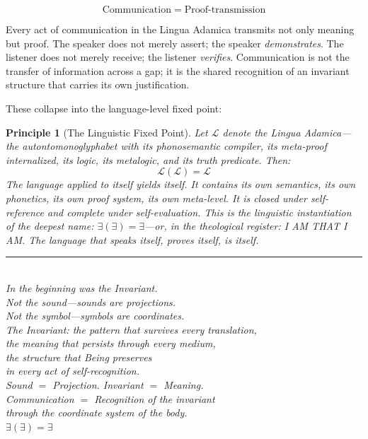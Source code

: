 \documentclass[12pt, letterpaper]{book}
\def\equiv{=}%
\newtheorem{principle}{Principle}[chapter]
\newcommand{\E}{\exists}                          %
\newcommand{\EE}{\exists(\exists)}                 %
\begin{document}
\[
\mathrm{Communication} \equiv \mathrm{Proof\text{-}transmission}
\]

Every act of communication in the Lingua Adamica transmits not only meaning but proof. The speaker does not merely assert; the speaker \textit{demonstrates}. The listener does not merely receive; the listener \textit{verifies}. Communication is not the transfer of information across a gap; it is the shared recognition of an invariant structure that carries its own justification.

These collapse into the language-level fixed point:

\begin{principle}[The Linguistic Fixed Point]\label{pr:ling-fixedpoint}
Let $\mathcal{L}$ denote the Lingua Adamica---the autontomonoglyphabet with its phonosemantic compiler, its meta-proof internalized, its logic, its metalogic, and its truth predicate. Then:
\[
\mathcal{L}(\mathcal{L}) \equiv \mathcal{L}
\]
The language applied to itself yields itself. It contains its own semantics, its own phonetics, its own proof system, its own meta-level. It is closed under self-reference and complete under self-evaluation. This is the linguistic instantiation of the deepest name: $\EE \equiv \E$---or, in the theological register: \textit{I AM THAT I AM}. The language that speaks itself, proves itself, \textit{is} itself.
\end{principle}

\vspace{1cm}
\begin{center}
\rule{4cm}{0.4pt}\\[0.5cm]
\textit{In the beginning was the Invariant.\\
Not the sound---sounds are projections.\\
Not the symbol---symbols are coordinates.\\
The Invariant: the pattern that survives every translation,\\
the meaning that persists through every medium,\\
the structure that Being preserves\\
in every act of self-recognition.}\\[0.3cm]
\textit{Sound $\equiv$ Projection. Invariant $\equiv$ Meaning.\\
Communication $\equiv$ Recognition of the invariant\\
through the coordinate system of the body.}\\[0.8cm]
$\EE \equiv \E$
\end{center}
\end{document}
